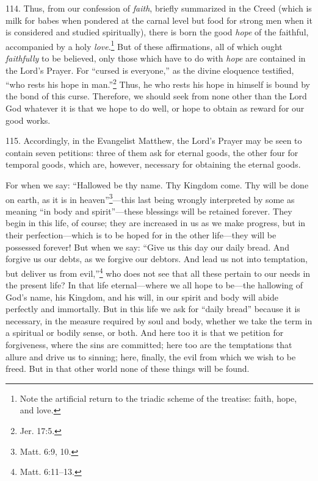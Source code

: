 
114. Thus, from our confession of \emph{faith}, briefly summarized in the Creed (which is milk for babes when pondered at the carnal level but food for strong men when it is considered and studied spiritually), there is born the good \emph{hope} of the faithful, accompanied by a holy \emph{love}.\footnote{Note the artificial return to the triadic scheme of the treatise: faith, hope, and love.} But of these affirmations, all of which ought \emph{faithfully} to be believed, only those which have to do with \emph{hope} are contained in the Lord's Prayer. For ``cursed is everyone,'' as the divine eloquence testified, ``who rests his hope in man.''\footnote{Jer. 17:5.} Thus, he who rests his hope in himself is bound by the bond of this curse. Therefore, we should seek from none other than the Lord God whatever it is that we hope to do well, or hope to obtain as reward for our good works.

115. Accordingly, in the Evangelist Matthew, the Lord's Prayer may be seen to contain seven petitions: three of them ask for eternal goods, the other four for temporal goods, which are, however, necessary for obtaining the eternal goods.

For when we say: ``Hallowed be thy name. Thy Kingdom come. Thy will be done on earth, as it is in heaven''\footnote{Matt. 6:9, 10.}—this last being wrongly interpreted by some as meaning ``in body and spirit''—these blessings will be retained forever. They begin in this life, of course; they are increased in us as we make progress, but in their perfection—which is to be hoped for in the other life—they will be possessed forever! But when we say: ``Give us this day our daily bread. And forgive us our debts, as we forgive our debtors. And lead us not into temptation, but deliver us from evil,''\footnote{Matt. 6:11–13.} who does not see that all these pertain to our needs in the present life? In that life eternal—where we all hope to be—the hallowing of God's name, his Kingdom, and his will, in our spirit and body will abide perfectly and immortally. But in this life we ask for ``daily bread'' because it is necessary, in the measure required by soul and body, whether we take the term in a spiritual or bodily sense, or both. And here too it is that we petition for forgiveness, where the sins are committed; here too are the temptations that allure and drive us to sinning; here, finally, the evil from which we wish to be freed. But in that other world none of these things will be found.


